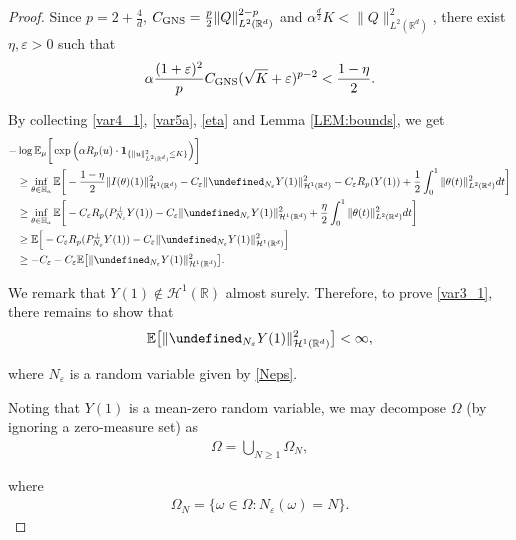 \documentclass[%
11pt,  reqno]{amsart}
\theoremstyle{remarkstyle}
\newcommand{\1}{\hspace{0.2mm}\text{I}\hspace{0.2mm}}
\newcommand{\noi}{\noindent}
\newcommand{\R}{\mathbb{R}}
\let\P= \undefined
\newcommand{\P}{\mathbf{P}}
\newcommand{\E}{\mathbb{E}}
\newcommand{\al}{\alpha}
\newcommand{\eps}{\varepsilon}
\renewcommand{\o}{\omega}
\renewcommand{\O}{\Omega}
\newcommand{\ind}{\mathbf 1}
\renewcommand{\H}{\mathcal{H}}
\numberwithin{equation}{section}
\numberwithin{theorem}{section}
\begin{document}
\begin{proof}
		\noi
		Since $p =2+\frac4d$, $C_{\textup{GNS}} = \frac{p}2 \|Q\|_{L^2(\R^d)}^{2-p}$ and $\al^{\frac{d}2} K<\|Q\|^2_{L^2(\R^d)}$, 
		there exist $\eta , \eps >0$ such that
		\begin{align}
			\label{eta}
			\al \frac{(1+\eps)^2}p C_{\textup{GNS}}  (\sqrt{K}+\eps)^{p-2}  < \frac{1-\eta}2.
		\end{align}
		
		\noi
		By collecting \eqref{var4_1}, \eqref{var5a}, \eqref{eta}
		and Lemma \ref{LEM:bounds},
		we get
		\begin{align*}
			\begin{split} 
				- & \log \E_\mu \bigg[ \exp \Big(\al R_p(u) \cdot  \ind_{\{\|u\|^2_{L^2(\R^d)}\le K\}} \Big)\bigg] \\
				& \ge \inf_{\theta \in \mathbb{H}_a} \E \bigg[  - \frac{1-\eta}{2} \| I(\theta)(1)\|_{\H^1 (\R^d)}^2 - C_\eps \| \P_{ N_\eps} Y(1)\|_{\H^1 (\R^d)}^2  -  C_\eps R_p(Y(1)) + \frac12 \int_0^1 
				\| \theta (t) \|_{L^2(\R^d)}^2 dt  \bigg]\\
				& \ge  \inf_{\theta \in \mathbb{H}_a}  \E \bigg[ -  C_\eps R_p(P_{N_\eps}^\perp Y(1)) - C_\eps \| \P_{N_\eps} Y(1)\|_{\H^1 (\R^d)}^2  + \frac{\eta}{2} \int_0^1 
				\| \theta (t) \|_{L^2(\R^d)}^2 dt \bigg] \\
				& \ge  \E \Big[ -  C_\eps R_p(P_{N_\eps}^\perp Y(1)) - C_\eps \| \P_{N_\eps} Y(1)\|_{\H^1 (\R^d)}^2  \Big] \\
				& \ge   -  C_\eps  - 
				C_\eps \E \big[  \| \P_{N_\eps} Y(1)\|_{\H^1 (\R^d)}^2  \big].
			\end{split}
		\end{align*}
		
		\noi
		We remark that $Y(1) \notin \H^1 (\R)$ almost surely.
		Therefore, to prove \eqref{var3_1},
		there remains to show that
		\begin{align}
			\label{Hsbound}
			\E \big[ \| \P_{N_\eps} Y(1)\|_{\H^1 (\R^d)}^2 \big] 
			< \infty,
		\end{align}
		
		\noi
		where $N_\eps$ is a random variable given by \eqref{Neps}.
		
		Noting that $Y(1)$ is a mean-zero random variable,
		we may decompose $\O$ (by ignoring a zero-measure set) as
		\begin{align}
			\label{decom}
			\O = \bigcup_{N \ge 1} \O_N,
		\end{align}
		
		\noi
		where
		\begin{align}
			\label{ON}
			\Omega_N = \big\{ \o\in \O : N_\eps (\o) = N \big\}.
		\end{align}
		

\end{proof}
\end{document}
